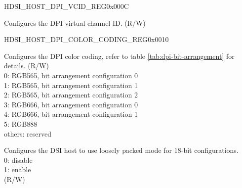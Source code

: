 \begin{register}{H}{DSI\_HOST\_DPI\_VCID\_REG}{0x000C}\label{regdesc:DSIHOSTDPIVCIDREG}
%
%
\regnewline%
\begin{regdesc}\begin{reglist}
\label{fielddesc:DSIHOSTDPIVCID}\item [DSI\_HOST\_DPI\_VCID] Configures the DPI virtual channel ID. (R/W)
\end{reglist}\end{regdesc}
\end{register}


\begin{register}{H}{DSI\_HOST\_DPI\_COLOR\_CODING\_REG}{0x0010}\label{regdesc:DSIHOSTDPICOLORCODINGREG}
%
%
%
%
\regnewline%
\begin{regdesc}\begin{reglist}
\label{fielddesc:DSIHOSTDPICOLORCODING}\item [DSI\_HOST\_DPI\_COLOR\_CODING] Configures the DPI color coding, refer to table \ref{tab:dpi-bit-arrangement} for details. (R/W)\\
0: RGB565, bit arrangement configuration 0\\
1: RGB565, bit arrangement configuration 1\\
2: RGB565, bit arrangement configuration 2\\
3: RGB666, bit arrangement configuration 0\\
4: RGB666, bit arrangement configuration 1\\
5: RGB888\\
others: reserved
\label{fielddesc:DSIHOSTLOOSELY18EN}\item [DSI\_HOST\_LOOSELY18\_EN] Configures the DSI host to use loosely packed mode for 18-bit configurations. \\0: disable\\1: enable \\(R/W)
\end{reglist}\end{regdesc}
\end{register}


